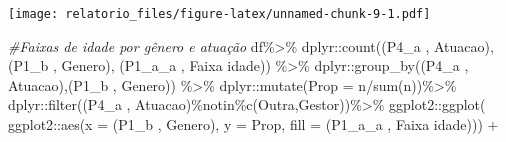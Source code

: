 \documentclass[
]{article}
\newenvironment{Shaded}{\begin{snugshade}}{\end{snugshade}}
\newcommand{\AttributeTok}[1]{\textcolor[rgb]{0.77,0.63,0.00}{#1}}
\newcommand{\CommentTok}[1]{\textcolor[rgb]{0.56,0.35,0.01}{\textit{#1}}}
\newcommand{\FunctionTok}[1]{\textcolor[rgb]{0.00,0.00,0.00}{#1}}
\newcommand{\NormalTok}[1]{#1}
\newcommand{\SpecialCharTok}[1]{\textcolor[rgb]{0.00,0.00,0.00}{#1}}
\newcommand{\StringTok}[1]{\textcolor[rgb]{0.31,0.60,0.02}{#1}}
\begin{document}
\texttt{[image: relatorio\_files/figure-latex/unnamed-chunk-9-1.pdf]}

\begin{Shaded}
\begin{Highlighting}[]
\CommentTok{\#Faixas de idade por gênero e atuação}
\NormalTok{df}\SpecialCharTok{\%\textgreater{}\%}
\NormalTok{  dplyr}\SpecialCharTok{::}\FunctionTok{count}\NormalTok{(}\StringTok{\textasciigrave{}}\AttributeTok{(\textquotesingle{}P4\_a \textquotesingle{}, \textquotesingle{}Atuacao\textquotesingle{})}\StringTok{\textasciigrave{}}\NormalTok{,}\StringTok{\textasciigrave{}}\AttributeTok{(\textquotesingle{}P1\_b \textquotesingle{}, \textquotesingle{}Genero\textquotesingle{})}\StringTok{\textasciigrave{}}\NormalTok{,}
               \StringTok{\textasciigrave{}}\AttributeTok{(\textquotesingle{}P1\_a\_a \textquotesingle{}, \textquotesingle{}Faixa idade\textquotesingle{})}\StringTok{\textasciigrave{}}\NormalTok{) }\SpecialCharTok{\%\textgreater{}\%}
\NormalTok{  dplyr}\SpecialCharTok{::}\FunctionTok{group\_by}\NormalTok{(}\StringTok{\textasciigrave{}}\AttributeTok{(\textquotesingle{}P4\_a \textquotesingle{}, \textquotesingle{}Atuacao\textquotesingle{})}\StringTok{\textasciigrave{}}\NormalTok{,}\StringTok{\textasciigrave{}}\AttributeTok{(\textquotesingle{}P1\_b \textquotesingle{}, \textquotesingle{}Genero\textquotesingle{})}\StringTok{\textasciigrave{}}\NormalTok{) }\SpecialCharTok{\%\textgreater{}\%}
\NormalTok{  dplyr}\SpecialCharTok{::}\FunctionTok{mutate}\NormalTok{(}\AttributeTok{Prop =}\NormalTok{ n}\SpecialCharTok{/}\FunctionTok{sum}\NormalTok{(n))}\SpecialCharTok{\%\textgreater{}\%}
\NormalTok{  dplyr}\SpecialCharTok{::}\FunctionTok{filter}\NormalTok{(}\StringTok{\textasciigrave{}}\AttributeTok{(\textquotesingle{}P4\_a \textquotesingle{}, \textquotesingle{}Atuacao\textquotesingle{})}\StringTok{\textasciigrave{}}\SpecialCharTok{\%notin\%}\FunctionTok{c}\NormalTok{(}\StringTok{\textquotesingle{}Outra\textquotesingle{}}\NormalTok{,}\StringTok{\textquotesingle{}Gestor\textquotesingle{}}\NormalTok{))}\SpecialCharTok{\%\textgreater{}\%}
\NormalTok{  ggplot2}\SpecialCharTok{::}\FunctionTok{ggplot}\NormalTok{(}
\NormalTok{    ggplot2}\SpecialCharTok{::}\FunctionTok{aes}\NormalTok{(}\AttributeTok{x =} \StringTok{\textasciigrave{}}\AttributeTok{(\textquotesingle{}P1\_b \textquotesingle{}, \textquotesingle{}Genero\textquotesingle{})}\StringTok{\textasciigrave{}}\NormalTok{, }\AttributeTok{y =}\NormalTok{ Prop,}
                 \AttributeTok{fill =} \StringTok{\textasciigrave{}}\AttributeTok{(\textquotesingle{}P1\_a\_a \textquotesingle{}, \textquotesingle{}Faixa idade\textquotesingle{})}\StringTok{\textasciigrave{}}\NormalTok{)) }\SpecialCharTok{+}

\end{Highlighting}
\end{Shaded}
\end{document}
